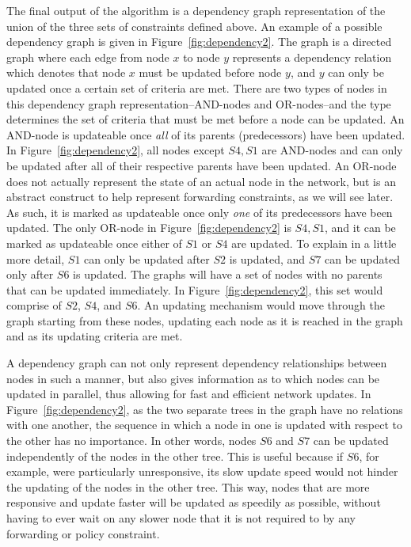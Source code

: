 \documentclass[pageno]{jpaper}
\begin{document}
The final output of the algorithm is a dependency graph representation of the union of the three sets of constraints defined above. An example of a possible dependency graph is given in Figure~\ref{fig:dependency2}. The graph is a directed graph where each edge from node $x$ to node $y$ represents a dependency relation which denotes that node $x$ must be updated before node $y$, and $y$ can only be updated once a certain set of criteria are met. There are two types of nodes in this dependency graph representation--AND-nodes and OR-nodes--and the type determines the set of criteria that must be met before a node can be updated. An AND-node is updateable once \textit{all} of its parents (predecessors) have been updated. In Figure~\ref{fig:dependency2}, all nodes except $S4,S1$ are AND-nodes and can only be updated after all of their respective parents have been updated. An OR-node does not actually represent the state of an actual node in the network, but is an abstract construct to help represent forwarding constraints, as we will see later. As such, it is marked as updateable once only \textit{one} of its predecessors have been updated. The only OR-node in Figure~\ref{fig:dependency2} is $S4,S1$, and it can be marked as updateable once either of $S1$ or $S4$ are updated. To explain in a little more detail, $S1$ can only be updated after $S2$ is updated, and $S7$ can be updated only after $S6$ is updated. The graphs will have a set of nodes with no parents that can be updated immediately. In Figure~\ref{fig:dependency2}, this set would comprise of $S2$, $S4$, and $S6$. An updating mechanism would move through the graph starting from these nodes, updating each node as it is reached in the graph and as its updating criteria are met. 

A dependency graph can not only represent dependency relationships between nodes in such a manner, but also gives information as to which nodes can be updated in parallel, thus allowing for fast and efficient network updates. In Figure~\ref{fig:dependency2}, as the two separate trees in the graph have no relations with one another, the sequence in which a node in one is updated with respect to the other has no importance. In other words, nodes $S6$ and $S7$ can be updated independently of the nodes in the other tree. This is useful because if $S6$, for example, were particularly unresponsive, its slow update speed would not hinder the updating of the nodes in the other tree. This way, nodes that are more responsive and update faster will be updated as speedily as possible, without having to ever wait on any slower node that it is not required to by any forwarding or policy constraint.
\end{document}
